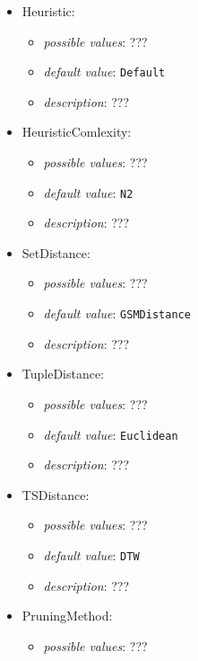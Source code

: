 \documentclass{article}
\begin{document}
\begin{itemize}
    \item Heuristic:
           \begin{itemize}
                \item \emph{possible values}: ???
                \item \emph{default value}: \texttt{Default}
                \item \emph{description}: ???
           \end{itemize}
    \item HeuristicComlexity:
           \begin{itemize}
                \item \emph{possible values}: ???
                \item \emph{default value}: \texttt{N2}
                \item \emph{description}: ???
           \end{itemize}
    \item SetDistance:
           \begin{itemize}
                \item \emph{possible values}: ???
                \item \emph{default value}: \texttt{GSMDistance}
                \item \emph{description}: ???
           \end{itemize}
    \item TupleDistance:
           \begin{itemize}
                \item \emph{possible values}: ???
                \item \emph{default value}: \texttt{Euclidean}
                \item \emph{description}: ???
           \end{itemize}
    \item TSDistance:
           \begin{itemize}
                \item \emph{possible values}: ???
                \item \emph{default value}: \texttt{DTW}
                \item \emph{description}: ???
           \end{itemize}
    \item PruningMethod:
           \begin{itemize}
                \item \emph{possible values}: ???

\end{itemize}
\end{itemize}
\end{document}
